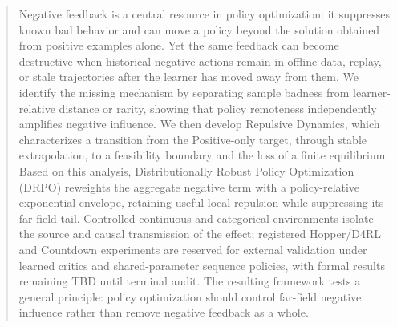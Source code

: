 \begin{abstract}

Negative feedback is a central resource in policy optimization: it suppresses known bad behavior and can move a policy beyond the solution obtained from positive examples alone. Yet the same feedback can become destructive when historical negative actions remain in offline data, replay, or stale trajectories after the learner has moved away from them. We identify the missing mechanism by separating sample badness from learner-relative distance or rarity, showing that policy remoteness independently amplifies negative influence. We then develop Repulsive Dynamics, which characterizes a transition from the Positive-only target, through stable extrapolation, to a feasibility boundary and the loss of a finite equilibrium. Based on this analysis, Distributionally Robust Policy Optimization (DRPO) reweights the aggregate negative term with a policy-relative exponential envelope, retaining useful local repulsion while suppressing its far-field tail. Controlled continuous and categorical environments isolate the source and causal transmission of the effect; registered Hopper/D4RL and Countdown experiments are reserved for external validation under learned critics and shared-parameter sequence policies, with formal results remaining TBD until terminal audit. The resulting framework tests a general principle: policy optimization should control far-field negative influence rather than remove negative feedback as a whole.
\end{abstract}
